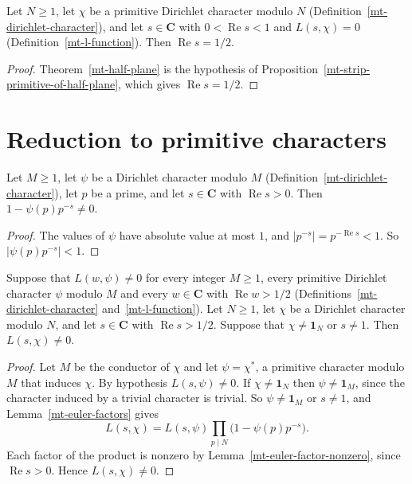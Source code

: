 \begin{theorem}\label{mt-strip-primitive}
Let $N\geq1$, let $\chi$ be a primitive Dirichlet character modulo $N$
(Definition~\ref{mt-dirichlet-character}), and let $s\in\mathbf C$ with $0<\operatorname{Re}s<1$
and $L(s,\chi)=0$ (Definition~\ref{mt-l-function}). Then $\operatorname{Re}s=1/2$.
\end{theorem}
\begin{proof}
Theorem~\ref{mt-half-plane} is the hypothesis of
Proposition~\ref{mt-strip-primitive-of-half-plane}, which gives $\operatorname{Re}s=1/2$.
\end{proof}

\section{Reduction to primitive characters}\label{section-mt-imprimitive}

\begin{lemma}\label{mt-euler-factor-nonzero}
Let $M\geq1$, let $\psi$ be a Dirichlet character modulo $M$
(Definition~\ref{mt-dirichlet-character}), let $p$ be a prime, and let $s\in\mathbf C$ with
$\operatorname{Re}s>0$. Then $1-\psi(p)p^{-s}\neq0$.
\end{lemma}
\begin{proof}
The values of $\psi$ have absolute value at most $1$, and $|p^{-s}|=p^{-\operatorname{Re}s}<1$.
So $|\psi(p)p^{-s}|<1$.
\end{proof}

\begin{proposition}\label{mt-imprimitive}
Suppose that $L(w,\psi)\neq0$ for every integer $M\geq1$, every primitive Dirichlet character
$\psi$ modulo $M$ and every $w\in\mathbf C$ with $\operatorname{Re}w>1/2$
(Definitions~\ref{mt-dirichlet-character} and~\ref{mt-l-function}). Let $N\geq1$, let $\chi$ be a
Dirichlet character modulo $N$, and let $s\in\mathbf C$ with $\operatorname{Re}s>1/2$. Suppose that
$\chi\neq\mathbf 1_N$ or $s\neq1$. Then $L(s,\chi)\neq0$.
\end{proposition}
\begin{proof}
Let $M$ be the conductor of $\chi$ and let $\psi=\chi^*$, a primitive character modulo $M$ that
induces $\chi$. By hypothesis $L(s,\psi)\neq0$. If $\chi\neq\mathbf 1_N$ then $\psi\neq\mathbf 1_M$,
since the character induced by a trivial character is trivial. So $\psi\neq\mathbf 1_M$ or
$s\neq1$, and Lemma~\ref{mt-euler-factors} gives
\[
 L(s,\chi)=L(s,\psi)\prod_{p\mid N}\bigl(1-\psi(p)p^{-s}\bigr).
\]
Each factor of the product is nonzero by Lemma~\ref{mt-euler-factor-nonzero}, since
$\operatorname{Re}s>0$. Hence $L(s,\chi)\neq0$.
\end{proof}

